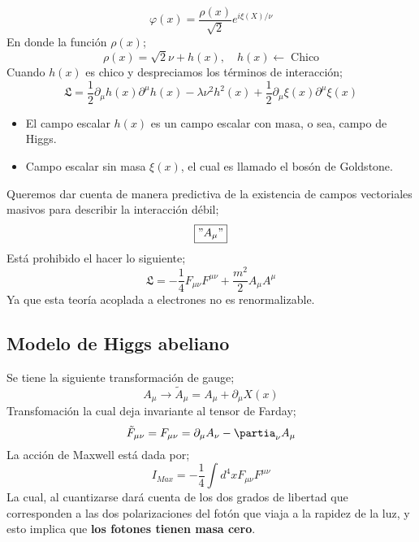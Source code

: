 \documentclass[../main.tex]{subfiles}
\begin{document}
\begin{equation}
  \varphi(x) = \frac{\rho(x)}{\sqrt{2}} e^{i\xi(X)/\nu}
 \end{equation}
 En donde la función $\rho(x)$;
 \begin{equation}
   \rho(x) = \sqrt{2}\nu + h(x), \quad h(x)\leftarrow \; \text{Chico}
  \end{equation}
Cuando $h(x)$ es chico y despreciamos los términos de interacción;
\begin{equation}
  \mathfrak{L} = \frac{1}{2}\partial_\mu h(x)\partial^\mu h(x) - \lambda \nu^2 h^2(x) + \frac{1}{2} \partial_\mu \xi(x) \partial^\mu \xi(x)
 \end{equation}
 \begin{itemize}
   \item El campo escalar $h(x)$ es un campo escalar con masa, o sea, campo de Higgs.
   \item Campo escalar sin masa $\xi(x)$, el cual es llamado el bosón de Goldstone.
 \end{itemize}
 Queremos dar cuenta de manera predictiva de la existencia de campos vectoriales masivos para describir la interacción débil;
 \begin{equation*}
   \boxed{
   "A_\mu"}
  \end{equation*}
Está prohibido el hacer lo siguiente;
\begin{equation}
  \mathfrak{L} = -\frac{1}{4}F_{\mu\nu}F^{\mu\nu} + \frac{m^2}{2} A_{\mu}A^\mu
 \end{equation}
 Ya que esta teoría acoplada a electrones no es renormalizable.


 \subsection{Modelo de Higgs abeliano}
Se tiene la siguiente transformación de gauge;
\begin{equation}
  A_\mu \rightarrow \tilde{A}_\mu = A_\mu+ \partial_\mu X (x)
 \end{equation}
 Transfomación la cual deja invariante al tensor de Farday;
 \begin{equation}
   \tilde{F}_{\mu\nu} = F_{\mu\nu} = \partial_\mu A_\nu - \partia_\nu A_\mu
  \end{equation}
  La acción de Maxwell está dada por;
  \begin{equation}
    I_{Max} = -\frac{1}{4} \int d^4x F_{\mu\nu} F^{\mu\nu}
   \end{equation}
   La cual, al cuantizarse dará cuenta de los dos grados de libertad que corresponden a las dos polarizaciones del fotón que viaja a la rapidez de la luz, y esto implica que \textbf{los fotones tienen masa cero}.
\end{document}
